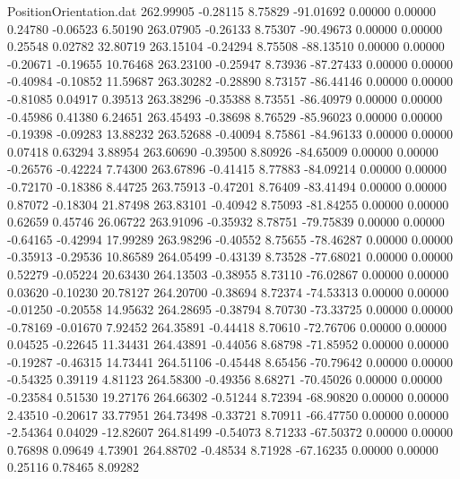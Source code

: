 \begin{filecontents}{PositionOrientation.dat}
 262.99905   -0.28115    8.75829   -91.01692    0.00000    0.00000    0.24780   -0.06523    6.50190
 263.07905   -0.26133    8.75307   -90.49673    0.00000    0.00000    0.25548    0.02782   32.80719
 263.15104   -0.24294    8.75508   -88.13510    0.00000    0.00000   -0.20671   -0.19655   10.76468
 263.23100   -0.25947    8.73936   -87.27433    0.00000    0.00000   -0.40984   -0.10852   11.59687
 263.30282   -0.28890    8.73157   -86.44146    0.00000    0.00000   -0.81085    0.04917    0.39513
 263.38296   -0.35388    8.73551   -86.40979    0.00000    0.00000   -0.45986    0.41380    6.24651
 263.45493   -0.38698    8.76529   -85.96023    0.00000    0.00000   -0.19398   -0.09283   13.88232
 263.52688   -0.40094    8.75861   -84.96133    0.00000    0.00000    0.07418    0.63294    3.88954
 263.60690   -0.39500    8.80926   -84.65009    0.00000    0.00000   -0.26576   -0.42224    7.74300
 263.67896   -0.41415    8.77883   -84.09214    0.00000    0.00000   -0.72170   -0.18386    8.44725
 263.75913   -0.47201    8.76409   -83.41494    0.00000    0.00000    0.87072   -0.18304   21.87498
 263.83101   -0.40942    8.75093   -81.84255    0.00000    0.00000    0.62659    0.45746   26.06722
 263.91096   -0.35932    8.78751   -79.75839    0.00000    0.00000   -0.64165   -0.42994   17.99289
 263.98296   -0.40552    8.75655   -78.46287    0.00000    0.00000   -0.35913   -0.29536   10.86589
 264.05499   -0.43139    8.73528   -77.68021    0.00000    0.00000    0.52279   -0.05224   20.63430
 264.13503   -0.38955    8.73110   -76.02867    0.00000    0.00000    0.03620   -0.10230   20.78127
 264.20700   -0.38694    8.72374   -74.53313    0.00000    0.00000   -0.01250   -0.20558   14.95632
 264.28695   -0.38794    8.70730   -73.33725    0.00000    0.00000   -0.78169   -0.01670    7.92452
 264.35891   -0.44418    8.70610   -72.76706    0.00000    0.00000    0.04525   -0.22645   11.34431
 264.43891   -0.44056    8.68798   -71.85952    0.00000    0.00000   -0.19287   -0.46315   14.73441
 264.51106   -0.45448    8.65456   -70.79642    0.00000    0.00000   -0.54325    0.39119    4.81123
 264.58300   -0.49356    8.68271   -70.45026    0.00000    0.00000   -0.23584    0.51530   19.27176
 264.66302   -0.51244    8.72394   -68.90820    0.00000    0.00000    2.43510   -0.20617   33.77951
 264.73498   -0.33721    8.70911   -66.47750    0.00000    0.00000   -2.54364    0.04029  -12.82607
 264.81499   -0.54073    8.71233   -67.50372    0.00000    0.00000    0.76898    0.09649    4.73901
 264.88702   -0.48534    8.71928   -67.16235    0.00000    0.00000    0.25116    0.78465    8.09282

\end{filecontents}

